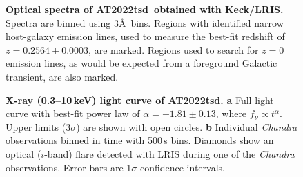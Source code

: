 \documentclass{nature_plusfigure}
\newcommand{\at}{AT2022tsd}
\begin{document}
\begin{extended_data}

\renewcommand{\thefigure}{\arabic{figure}~Extended~Data}
\renewcommand{\thefigure}{Extended Data Figure \arabic{figure}}
\renewcommand{\figurename}{}
\setcounter{figure}{0}

\renewcommand{\thetable}{\arabic{table}~Extended~Data}
\renewcommand{\thetable}{Extended Data Table \arabic{table}}
\renewcommand{\tablename}{}
\setcounter{table}{0}

\begin{figure}[ht]
 \centering
  \caption{\textbf{Optical spectra of \at\ obtained with Keck/LRIS.} Spectra are binned using 3\AA\ bins. Regions with identified narrow host-galaxy emission lines, used to measure the best-fit redshift of $z=0.2564\pm0.0003$, are marked. Regions used to search for $z=0$ emission lines, as would be expected from a foreground Galactic transient, are also marked.}
 \label{fig:spec}
\end{figure}

\begin{figure}[!ht]
 \centering
  \caption{\textbf{X-ray (0.3--10\,keV) light curve of \at.} \textbf{a} Full light curve with best-fit power law of $\alpha=-1.81\pm0.13$, where $f_\nu \propto t^{\alpha}$. Upper limits (3$\sigma$) are shown with open circles. \textbf{b} Individual {\it Chandra} observations binned in time with 500\,s bins. Diamonds show an optical ($i$-band) flare detected with LRIS during one of the {\it Chandra} observations. Error bars are 1$\sigma$ confidence intervals.}
 \label{fig:xray-lc}
\end{figure}


\end{extended_data}
\end{document}
